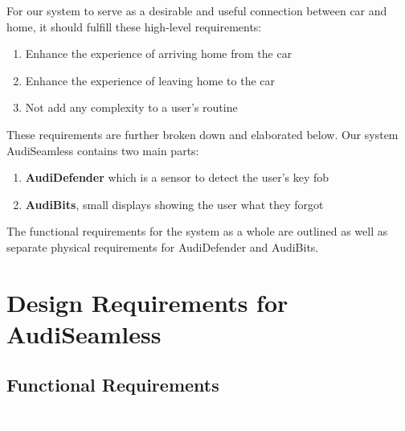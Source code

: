 For our system to serve as a desirable and useful connection between car and home, it should fulfill these high-level requirements:

\begin{enumerate}
\item Enhance the experience of arriving home from the car
\item Enhance the experience of leaving home to the car
\item Not add any complexity to a user's routine
\end{enumerate}

\noindent
These requirements are further broken down and elaborated below. Our system AudiSeamless contains two main parts: 
\begin{enumerate}
    \item \textbf{AudiDefender} which is a sensor to detect the user's key fob
    \item \textbf{AudiBits}, small displays showing the user what they forgot
\end{enumerate}
 \noindent The functional requirements for the system as a whole are outlined as well as separate physical requirements for AudiDefender and AudiBits.


\section{Design Requirements for AudiSeamless}

\subsection*{Functional Requirements}

\textcolor{white}{text needed to format tables correctly}

